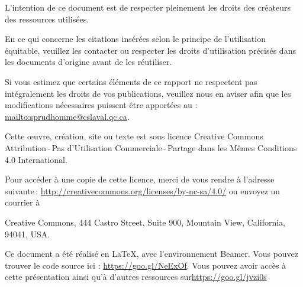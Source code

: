 \documentclass{beamer}
\begin{document}
\framebreak
\par L’intention de ce document est de respecter pleinement les droits des créateurs des ressources
utilisées.
	\par En ce qui concerne les citations insérées selon le principe de l'utilisation équitable, veuillez les contacter ou respecter les droits d’utilisation précisés dans les documents d’origine avant de les réutiliser.
	\par Si vous estimez que certains éléments de ce rapport ne respectent pas intégralement les droits de vos
publications, veuillez nous en aviser afin que les modifications nécessaires puissent être apportées au : \url{mailto:sprudhomme@cslaval.qc.ca}.
	\par Cette \oe uvre, création, site ou texte est sous licence Creative Commons Attribution\,-\,Pas d’Utilisation Commerciale\,-\,Partage dans les Mêmes Conditions 4.0 International. \\
	\par 
	 Pour accéder à une copie de cette licence, merci de vous rendre à l'adresse suivante\,: \url{http://creativecommons.org/licenses/by-nc-sa/4.0/} ou envoyez un courrier à 

\par Creative Commons, 444 Castro Street, Suite 900, Mountain View, California, 94041, USA.
\par Ce document a été réalisé en \LaTeX, avec l'environnement Beamer. Vous pouvez trouver le code source ici : \url{https://goo.gl/NeExOf}. Vous pouvez avoir accès à cette présentation ainsi qu'à d'autres ressources sur\url{https://goo.gl/jvzi0s}
  
\end{document}
